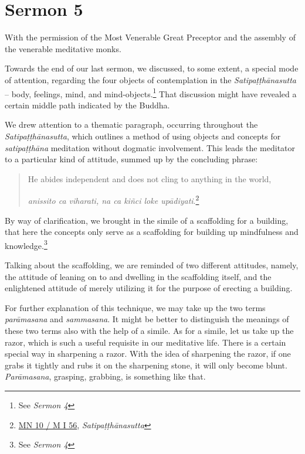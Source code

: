 \chapter{Sermon 5}

\NibbanaOpeningQuote

With the permission of the Most Venerable Great Preceptor and the assembly of the venerable meditative monks.

Towards the end of our last sermon, we discussed, to some extent, a special mode of attention, regarding the four objects of contemplation in the \emph{Satipaṭṭhānasutta} -- body, feelings, mind, and mind-objects.\footnote{See \emph{Sermon 4}} That discussion might have revealed a certain middle path indicated by the Buddha.

We drew attention to a thematic paragraph, occurring throughout the \emph{Satipaṭṭhānasutta}, which outlines a method of using objects and concepts for \emph{satipaṭṭhāna} meditation without dogmatic involvement. This leads the meditator to a particular kind of attitude, summed up by the concluding phrase:

\enlargethispage{\baselineskip}

\begin{quote}
He abides independent and does not cling to anything in the world,

\emph{anissito ca viharati, na ca kiñci loke upādiyati}.\footnote{\href{https://suttacentral.net/mn10/pli/ms}{MN 10 / M I 56}, \emph{Satipaṭṭhānasutta}}
\end{quote}

By way of clarification, we brought in the simile of a scaffolding for a building, that here the concepts only serve as a scaffolding for building up mindfulness and knowledge.\footnote{See \emph{Sermon 4}}

Talking about the scaffolding, we are reminded of two different attitudes, namely, the attitude of leaning on to and dwelling in the scaffolding itself, and the enlightened attitude of merely utilizing it for the purpose of erecting a building.

For further explanation of this technique, we may take up the two terms \emph{parāmasana} and \emph{sammasana}. It might be better to distinguish the meanings of these two terms also with the help of a simile. As for a simile, let us take up the razor, which is such a useful requisite in our meditative life. There is a certain special way in sharpening a razor. With the idea of sharpening the razor, if one grabs it tightly and rubs it on the sharpening stone, it will only become blunt. \emph{Parāmasana}, grasping, grabbing, is something like that.

